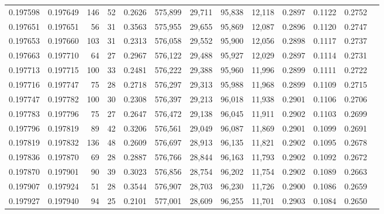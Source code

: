 \begin{tabular}{rrrrrrrrrrrrr}
0.197598 & 0.197649 &   146 &  52 &                                     0.2626 & 575,899 &  29,711 &  95,838 &  12,118 & 0.2897 & 0.1122 & 0.2752 \\
0.197651 & 0.197651 &    56 &  31 &                                     0.3563 & 575,955 &  29,655 &  95,869 &  12,087 & 0.2896 & 0.1120 & 0.2747 \\
0.197653 & 0.197660 &   103 &  31 &                                     0.2313 & 576,058 &  29,552 &  95,900 &  12,056 & 0.2898 & 0.1117 & 0.2737 \\
0.197663 & 0.197710 &    64 &  27 &                                     0.2967 & 576,122 &  29,488 &  95,927 &  12,029 & 0.2897 & 0.1114 & 0.2731 \\
0.197713 & 0.197715 &   100 &  33 &                                     0.2481 & 576,222 &  29,388 &  95,960 &  11,996 & 0.2899 & 0.1111 & 0.2722 \\
0.197716 & 0.197747 &    75 &  28 &                                     0.2718 & 576,297 &  29,313 &  95,988 &  11,968 & 0.2899 & 0.1109 & 0.2715 \\
0.197747 & 0.197782 &   100 &  30 &                                     0.2308 & 576,397 &  29,213 &  96,018 &  11,938 & 0.2901 & 0.1106 & 0.2706 \\
0.197783 & 0.197796 &    75 &  27 &                                     0.2647 & 576,472 &  29,138 &  96,045 &  11,911 & 0.2902 & 0.1103 & 0.2699 \\
0.197796 & 0.197819 &    89 &  42 &                                     0.3206 & 576,561 &  29,049 &  96,087 &  11,869 & 0.2901 & 0.1099 & 0.2691 \\
0.197819 & 0.197832 &   136 &  48 &                                     0.2609 & 576,697 &  28,913 &  96,135 &  11,821 & 0.2902 & 0.1095 & 0.2678 \\
0.197836 & 0.197870 &    69 &  28 &                                     0.2887 & 576,766 &  28,844 &  96,163 &  11,793 & 0.2902 & 0.1092 & 0.2672 \\
0.197870 & 0.197901 &    90 &  39 &                                     0.3023 & 576,856 &  28,754 &  96,202 &  11,754 & 0.2902 & 0.1089 & 0.2663 \\
0.197907 & 0.197924 &    51 &  28 &                                     0.3544 & 576,907 &  28,703 &  96,230 &  11,726 & 0.2900 & 0.1086 & 0.2659 \\
0.197927 & 0.197940 &    94 &  25 &                                     0.2101 & 577,001 &  28,609 &  96,255 &  11,701 & 0.2903 & 0.1084 & 0.2650 \\

\end{tabular}
